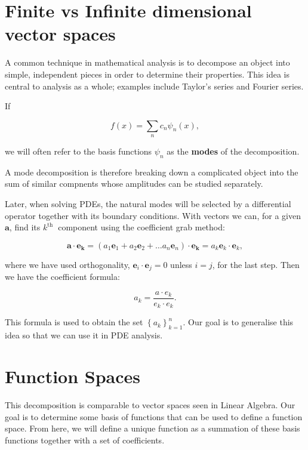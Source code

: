 \section{Finite vs Infinite dimensional vector spaces}

A common technique in mathematical analysis is to decompose an object into simple, independent pieces in order to determine their properties. This idea is central to analysis as a whole; examples include Taylor's series and Fourier series.

\begin{definition}
If

\[
f(x)=\sum_n c_n \psi_n(x),
\]

we will often refer to the basis functions \(\psi_n\) as the \textbf{modes} of the decomposition.
\end{definition}

A mode decomposition is therefore breaking down a complicated object into the sum of similar compnents whose amplitudes can be studied separately.


Later, when solving PDEs, the natural modes will be selected by a differential operator together with its boundary conditions. With vectors we can, for a given \(\boldsymbol{a}\), find its \(k^{\text {th }}\) component using the coefficient grab method:

\[
\boldsymbol{a} \cdot \boldsymbol{e}_{\boldsymbol{k}}=\left(a_1 \boldsymbol{e}_1+a_2 \boldsymbol{e}_2+\ldots a_n \boldsymbol{e}_n\right) \cdot \boldsymbol{e}_{\boldsymbol{k}}=a_k \boldsymbol{e}_k \cdot \boldsymbol{e}_k,
\]

where we have used orthogonality, \(\boldsymbol{e}_i \cdot \boldsymbol{e}_j=0\) unless \(i=j\), for the last step. Then we have the coefficient formula:

\[
a_k=\frac{a \cdot e_k}{e_k \cdot e_k} .
\]

This formula is used to obtain the set \(\left\{a_k\right\}_{k=1}^n\). Our goal is to generalise this idea so that we can use it in PDE analysis.



\section{Function Spaces}

This decomposition is comparable to vector spaces seen in Linear Algebra. Our goal is to determine some basis of functions that can be used to define a function space. From here, we will define a unique function as a summation of these basis functions together with a set of coefficients.

